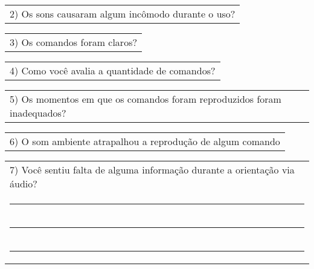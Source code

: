 \begin{table}[!thb]
    \begin{tabular}{m{1\linewidth}}
        \vspace{1ex}
        2)	Os sons causaram algum incômodo durante o uso?
    \end{tabular}

        
        
    
    \begin{tabular}{m{1\linewidth}}
        \vspace{1ex}
        3)	Os comandos foram claros?
    \end{tabular}

        
        

    \begin{tabular}{m{1\linewidth}}
        \vspace{1ex}
        4)	Como você avalia a quantidade de comandos?
    \end{tabular}

    
    
    
    \begin{tabular}{m{1\linewidth}}
        \vspace{1ex}
        5)	Os momentos em que os comandos foram reproduzidos foram inadequados?
    \end{tabular}

        
        
    
    \begin{tabular}{m{1\linewidth}}
        \vspace{1ex}
        6)	O som ambiente atrapalhou a reprodução de algum comando
    \end{tabular}

        
        
    
    \begin{tabular}{m{1\linewidth}}
        \vspace{1ex}
        7)	Você sentiu falta de alguma informação durante a orientação via áudio? \\

        \noindent
        \rule{6in}{.2mm} \\
        \rule{6in}{.2mm} \\
        \rule{6in}{.2mm}

    \end{tabular}
\end{table}

